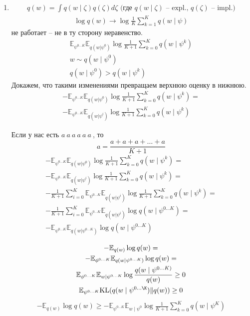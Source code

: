 \documentclass{book}
\begin{document}
\begin{enumerate}
\item \begin{gather*}
    q(w)=\int {q(w\mid \zeta)q(\zeta)d\zeta}\textrm{ (где $q(w\mid \zeta)$ -- expl., $q(\zeta)$ -- impl.)}
  \end{gather*}
  \begin{gather*}
    \log q(w) \rightarrow \log \frac{1}{K}\sum_{k=1}^{K} {q(w\mid\psi)}
  \end{gather*}
  не работает -- не в ту сторону неравенство.
  \begin{gather*}
    \mathbb{E}_{\psi^{0\dots K}}\mathbb{E}_{q(w|\psi^0)} \log \frac{1}{K+1}\sum_{k=0}^{K} {q(w\mid\psi^k)}\\
    w \sim q(w\mid \psi^0)\\
    q(w\mid \psi^0) > q(w\mid \psi^k)
  \end{gather*}
  Докажем, что такими изменениями превращаем верхнюю оценку в нижнюю.
  \begin{gather*}
    -\mathbb{E}_{\psi^{0\dots K}}\mathbb{E}_{q(w|\psi^0)} \log \frac{1}{K+1}\sum_{k=0}^{K} {q(w\mid\psi^k)}=\\
    -\mathbb{E}_{\psi^{0\dots K}}\mathbb{E}_{q(w|\psi^i)} \log \frac{1}{K+1}\sum_{k=0}^{K} {q(w\mid\psi^k)}
  \end{gather*}

  Если у нас есть $a~ a~ a~ a~ a~ a~$, то
  \[
    a=\frac{a+a+a+\dots+a}{K+1}
  \]
  \begin{gather*}
    -\mathbb{E}_{\psi^{0\dots K}}\mathbb{E}_{q(w|\psi^0)} \log \frac{1}{K+1}\sum_{k=0}^{K} {q(w\mid\psi^k)}=\\
    -\mathbb{E}_{\psi^{0\dots K}}\mathbb{E}_{q(w|\psi^i)} \log \frac{1}{K+1}\sum_{k=0}^{K} {q(w\mid\psi^k)}=\\
    -\frac{1}{K+1}\sum_{i=0}^{K} \mathbb{E}_{\psi^{0\dots K}}\mathbb{E}_{q(w|\psi^i)} \log \frac{1}{K+1}\sum_{k=0}^{K} {q(w\mid\psi^k)}=\\
    -\frac{1}{K+1}\sum_{i=0}^{K} \mathbb{E}_{\psi^{0\dots K}}\mathbb{E}_{q(w|\psi^i)} \log q(w\mid \psi^{0\dots K})=\\
    -\mathbb{E}_{\psi^{0\dots K}}\mathbb{E}_{q(w|\psi^{0\dots K})} \log q(w\mid \psi^{0\dots K})\\
  \end{gather*}
  \begin{gather*}
    -\mathbb{E}_{q(w)} \log q(w)=\\
    -\mathbb{E}_{\phi^{0\dots K}}\mathbb{E}_{q(w\mid \psi^{0\dots K})} \log q(w)=\\
    \mathbb{E}_{\phi^{0\dots K}}\mathbb{E}_{w\mid \psi^{0\dots K}} \log \frac{q(w\mid \psi^{0\dots K)}}{q(w)}\geq 0\\
    \mathbb{E}_{\psi^{0\dots K}}\mathrm{KL}(q(w\mid \psi^{0\dots \K})\|q(w))\geq 0
  \end{gather*}
  \begin{gather*}
    -\mathbb{E}_{q(w)}\log q(w)\geq -\mathbb{E}_{\psi^{0\dots K}}\mathbb{E}_{w\mid \psi^0}\log \frac{1}{K+1}\sum_{k=0}^{K} {q(w\mid \psi^K)}
  \end{gather*}




\end{enumerate}
\end{document}
